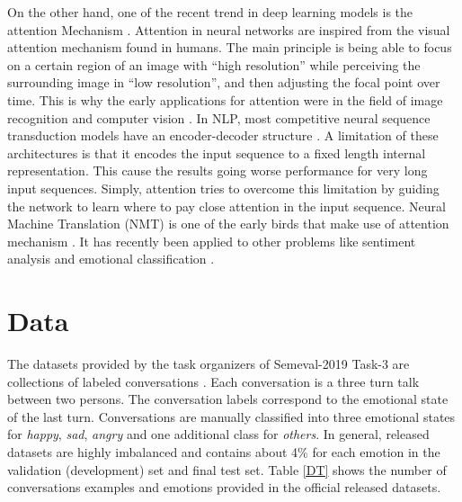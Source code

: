 \documentclass{article}
\begin{document}
On the other hand, one of the recent trend in deep learning models is the attention Mechanism \cite{recentNLP}. Attention in neural networks are inspired from the visual attention mechanism found in humans. The main principle is being able to focus on a certain region of an image with “high resolution” while perceiving the surrounding image in “low resolution”, and then adjusting the focal point over time. This is why the early applications for attention were in the field of image recognition and computer vision \cite{NIPS2010_4089}. In NLP, most competitive neural sequence transduction models have an encoder-decoder structure \cite{att_all}. A limitation of these architectures is that it encodes the input sequence to a fixed length internal representation. This cause the results going worse performance for very long input sequences. Simply, attention tries to overcome this limitation by guiding the network to learn where to pay close attention in the input sequence. Neural Machine Translation (NMT) is one of the early birds that make use of attention mechanism \cite{nmt}. It has recently been applied to other problems like sentiment analysis \cite{aspectS} and emotional classification \cite{emoOrg}.

\section{Data}\label{DS}
The datasets provided by the task organizers of Semeval-2019 Task-3 are collections of labeled conversations \cite{SemEval2019Task3}. Each conversation is a three turn talk between two persons. The conversation labels correspond to the emotional state of the last turn. Conversations are manually classified into three emotional states for \textit{happy}, \textit{sad}, \textit{angry} and one additional class for \textit{others}.  In general, released datasets are highly imbalanced and contains about 4\% for each emotion in the validation (development) set and final test set. Table \ref{DT} shows the number of conversations examples and emotions provided in the official released datasets.


\begin{table}[htbp]
\centering 

\caption{Used datasets.}
\label{DT}
\end{table}
\end{document}
